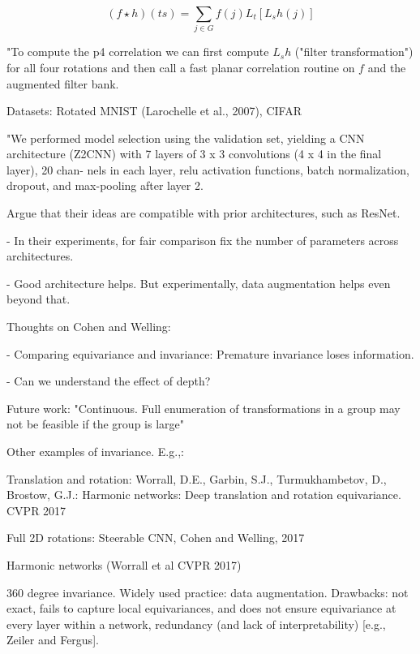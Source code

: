 \documentclass[english]{article}
\begin{document}
$$(f \star h)(ts) = \sum_{j\in G} f(j)L_t [L_sh(j)]$$

"To compute the p4  correlation we can
first compute $L_s h$ ("filter transformation") for all four rotations and then call a fast planar correlation routine on $f$ and the augmented filter bank.

\item Datasets: Rotated MNIST (Larochelle et al., 2007), CIFAR

"We performed model selection using the validation set,
yielding a CNN architecture (Z2CNN) with 7 layers of
3 x 3 convolutions (4 x 4 in the final layer), 20 chan-
nels in each layer, relu activation functions, batch normalization, dropout, and max-pooling after layer 2.

\item Argue that their ideas are compatible with prior architectures, such as ResNet. 


- In their experiments, for fair comparison fix the number of parameters across architectures. 

- Good architecture helps. But experimentally, data augmentation helps even beyond that.


\item Thoughts on Cohen and Welling: 

- Comparing equivariance and invariance: Premature invariance loses information. 

- Can we understand the effect of depth?

Future work: "Continuous. Full enumeration of
transformations in a group may not be feasible if the group
is large"

\item 

Other examples of invariance. E.g.,:


Translation and rotation: Worrall, D.E., Garbin, S.J., Turmukhambetov, D., Brostow, G.J.: Harmonic networks: Deep translation and rotation equivariance. CVPR 2017

Full 2D rotations: Steerable CNN, Cohen and Welling, 2017

\item Harmonic networks (Worrall et al CVPR 2017)

360 degree invariance. Widely used practice: data augmentation. Drawbacks: not exact, fails to capture
local equivariances, and does not ensure equivariance at every
layer within a network, redundancy (and lack of interpretability) [e.g., Zeiler and Fergus].
\end{document}
